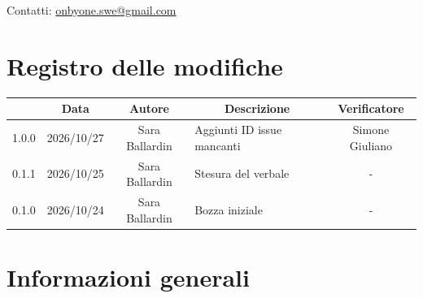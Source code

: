 \documentclass[11pt, a4paper]{article}
\begin{document}
\begin{titlepage}
    \vspace{0.5cm}
    
    {\large Contatti: \href{mailto:onbyone.swe@gmail.com}{onbyone.swe@gmail.com} }
    
\end{titlepage}

\newpage

\section*{Registro delle modifiche}

\vspace{1cm}
\begin{center}
    \renewcommand{\arraystretch}{1.5}
    \begin{tabularx}{\textwidth}{|c|c|c|X|c|}
        \hline
        \rowcolor{gray!10} 
        \multicolumn{1}{|c|}{\textbf{Versione}} & 
        \multicolumn{1}{c|}{\textbf{Data}} & 
        \multicolumn{1}{c|}{\textbf{Autore}} & 
        \multicolumn{1}{c|}{\textbf{Descrizione}} & 
        \multicolumn{1}{c|}{\textbf{Verificatore}} \\
        \hline
        1.0.0 & 2026/10/27 & Sara Ballardin & Aggiunti ID issue mancanti & Simone Giuliano \\
        \hline
        0.1.1 & 2026/10/25 & Sara Ballardin & Stesura del verbale & - \\
        \hline
        0.1.0 & 2026/10/24 & Sara Ballardin & Bozza iniziale & - \\
        \hline
    \end{tabularx}
\end{center}
\vfill
\newpage

\tableofcontents
\newpage

\section{Informazioni generali}
\end{document}
